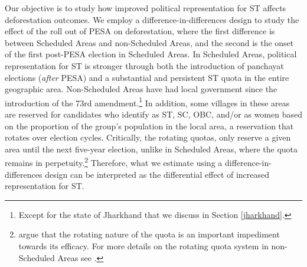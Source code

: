 \documentclass[12pt,reqno]{article}
\begin{document}
Our objective is to study how improved political representation for ST affects deforestation outcomes. We employ a difference-in-differences design to study the effect of the roll out of PESA on deforestation, where the first difference is between Scheduled Areas and non-Scheduled Areas, and the second is the onset of the first post-PESA election in Scheduled Areas. In Scheduled Areas, political representation for ST is stronger through both the introduction of panchayat elections (\emph{after} PESA) and a substantial and persistent ST quota in the entire geographic area. Non-Scheduled Areas have had local government since the introduction of the 73rd amendment.\footnote{Except for the state of Jharkhand that we discuss in Section \ref{jharkhand}.} In addition, some villages in these areas are reserved for candidates who identify as ST, SC, OBC, and/or as women based on the proportion of the group's population in the local area, a reservation that rotates over election cycles. Critically, the rotating quotas, only reserve a given area until the next five-year election, unlike in Scheduled Areas, where the quota remains in perpetuity.\footnote{\textcite{dunning2013ethnic} argue that the rotating nature of the quota is an important impediment towards its efficacy. For more details on the rotating quota system in non-Scheduled Areas see \textcite{chattopadhyayWomenPolicyMakers2004, bhavnani2009electoral,jensenius2017social}.} Therefore, what we estimate using a difference-in-differences design can be interpreted as the differential effect of increased representation for ST.





\end{document}
